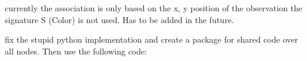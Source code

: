 
\begin{DoxyRefList}
\item[Member \mbox{\hyperlink{classEkf_abe3b666fe435503c8f75808a7a18f735}{Ekf\+::data\+\_\+association}} (Eigen\+::\+Vector3d observation)]\label{todo__todo000001}%
%
currently the association is only based on the x, y position of the observation the signature S (Color) is not used. Has to be added in the future.  
\item[Member \mbox{\hyperlink{classEkfROSWrapper_af3ba9a2abadedde769dcfe652672b227}{Ekf\+ROSWrapper\+::Ekf\+ROSWrapper}} ()]\label{todo__todo000002}%
%
fix the stupid python implementation and create a package for shared code over all nodes. Then use the following code\+: 
\end{DoxyRefList}